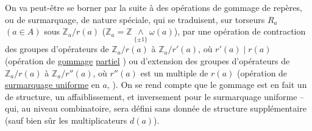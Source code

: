 On va peut-être se borner par la suite à des opérations de gommage de repères, ou de surmarquage, de nature spéciale, qui se traduisent, sur  torseurs $R_a$ $(a\in A)$  sous $\mathbb Z_a/r(a)$  ($\mathbb Z_a=\mathbb Z\mathbin{\underset{\{\pm1\}}{\wedge}}\omega(a)$), par une opération de contraction des groupes d'opérateurs de $\mathbb Z_a/r(a)$ à $\mathbb Z_a/r'(a)$, où $r'(a)\mid r(a)$ (opération de \uline{gommage} \uline{partiel}  ) ou d'extension des groupes d'opérateurs de $\mathbb Z_a/r(a)$ à $\mathbb Z_a/r''(a)$, où $r''(a)$  est un multiple de $r(a)$ (opération de \uline{surmarquage uniforme} en $a$, ). On se rend compte  que le gommage  est en fait un  de structure,  un affaiblissement, et inversement pour le surmarquage uniforme -- qui, au niveau combinatoire, sera défini sans donnée de structure supplémentaire (sauf bien sûr les multiplicateurs $d(a)$).

